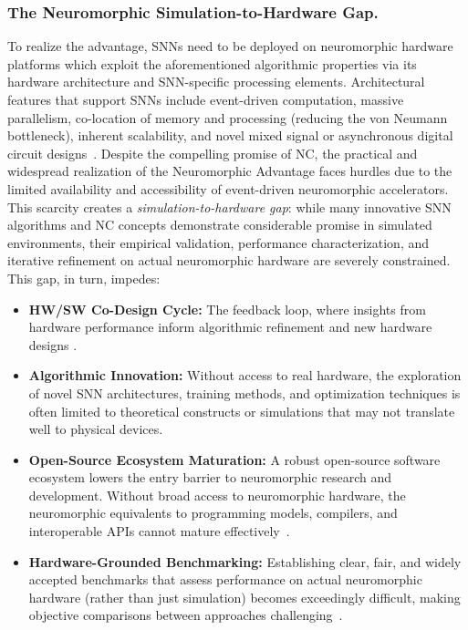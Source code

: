 \subsubsection{The Neuromorphic Simulation-to-Hardware Gap.}
To realize the advantage, SNNs need to be deployed on neuromorphic hardware platforms which exploit the aforementioned algorithmic properties via its hardware architecture and SNN-specific processing elements.
Architectural features that support SNNs include event-driven computation, massive parallelism, co-location of memory and processing (reducing the von Neumann bottleneck), inherent scalability, and novel mixed signal or asynchronous digital circuit designs~\cite{richter_dynap-se2_2024,hoppner_spinnaker_2022,davies_taking_2021}.
Despite the compelling promise of \ac{NC}, the practical and widespread realization of the Neuromorphic Advantage faces hurdles due to the limited availability and accessibility of event-driven neuromorphic accelerators. This scarcity creates a \textit{simulation-to-hardware gap}: while many innovative \ac{SNN} algorithms and \ac{NC} concepts demonstrate considerable promise in simulated environments, their empirical validation, performance characterization, and iterative refinement on actual neuromorphic hardware are severely constrained. This gap, in turn, impedes:
\begin{itemize}
    \item \textbf{HW/SW Co-Design Cycle:} The feedback loop, where insights from hardware performance inform algorithmic refinement and new hardware designs \cite{kudithipudi_neuromorphic_2025}.
    \item \textbf{Algorithmic Innovation:} Without access to real hardware, the exploration of novel SNN architectures, training methods, and optimization techniques is often limited to theoretical constructs or simulations that may not translate well to physical devices.
    \item \textbf{Open-Source Ecosystem Maturation:} A robust open-source software ecosystem lowers the entry barrier to neuromorphic research and development. Without broad access to neuromorphic hardware, the neuromorphic equivalents to programming models, compilers, and interoperable APIs cannot mature effectively~\cite{muir_road_2025}.
    \item \textbf{Hardware-Grounded Benchmarking:} Establishing clear, fair, and widely accepted benchmarks that assess performance on actual neuromorphic hardware (rather than just simulation) becomes exceedingly difficult, making objective comparisons between approaches challenging~\cite{yik_neurobench_2025}.
\end{itemize}
